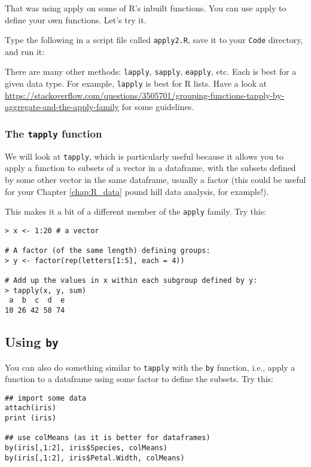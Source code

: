 That was using apply on some of R's inbuilt functions. You can use 
apply to define your own functions. Let's try it.
\begin{compactitem}[$\quad\star$]
\item Type the following in a script file called {\tt apply2.R}, save 
it to your {\tt Code} directory, and run it:
\end{compactitem}



There are many other methods: {\tt lapply}, {\tt sapply}, {\tt eapply}, 
etc. Each is best for a given data type. For example, {\tt lapply} is 
best for R lists. Have a look at {\scriptsize
\url{https://stackoverflow.com/questions/3505701/grouping-functions-tapply-by-aggregate-and-the-apply-family}} 
for some guidelines. 

\subsubsection{The {\tt tapply} function}
We will look at {\tt tapply}, which is particularly useful because it 
allows you to apply a function to subsets of a vector in a dataframe, 
with the subsets defined by some other vector in the same dataframe, 
usually a factor (this could be useful for your Chapter \ref{chap:R_data} 
pound hill data analysis, for example!). 

This makes it a bit of a different member of the {\tt *apply} family.  
Try this:
\begin{lstlisting}
> x <- 1:20 # a vector

# A factor (of the same length) defining groups:
> y <- factor(rep(letters[1:5], each = 4)) 

# Add up the values in x within each subgroup defined by y:
> tapply(x, y, sum)  
 a  b  c  d  e 
10 26 42 58 74
\end{lstlisting}
 
\subsection{Using {\tt by}}

You can also do something similar to {\tt tapply} with the {\tt by} 
function, i.e., apply a function to a dataframe using some factor to 
define the subsets. Try this:

\begin{lstlisting}
## import some data
attach(iris)
print (iris)

## use colMeans (as it is better for dataframes)
by(iris[,1:2], iris$Species, colMeans)
by(iris[,1:2], iris$Petal.Width, colMeans)
\end{lstlisting}

